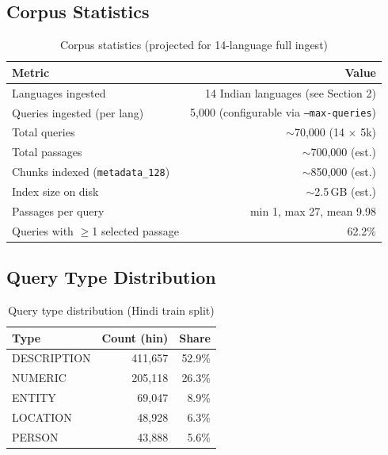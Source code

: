 \documentclass[12pt,a4paper]{article}
\begin{document}
\subsection{Corpus Statistics}

\begin{table}[H]
\centering
\begin{tabular}{lr}
\toprule
\textbf{Metric} & \textbf{Value} \\
\midrule
Languages ingested                    & 14 Indian languages (see Section 2) \\
Queries ingested (per lang)           & 5,000 (configurable via \texttt{--max-queries}) \\
Total queries                         & $\sim$70,000 (14 $\times$ 5k) \\
Total passages                        & $\sim$700,000 (est.) \\
Chunks indexed (\texttt{metadata\_128}) & $\sim$850,000 (est.) \\
Index size on disk                    & $\sim$2.5\,GB (est.) \\
Passages per query                    & min 1, max 27, mean 9.98 \\
Queries with $\geq$1 selected passage & 62.2\% \\
\bottomrule
\end{tabular}
\caption{Corpus statistics (projected for 14-language full ingest)}
\end{table}

\subsection{Query Type Distribution}

\begin{table}[H]
\centering
\begin{tabular}{lrr}
\toprule
\textbf{Type} & \textbf{Count (hin)} & \textbf{Share} \\
\midrule
DESCRIPTION & 411,657 & 52.9\% \\
NUMERIC     & 205,118 & 26.3\% \\
ENTITY      &  69,047 &  8.9\% \\
LOCATION    &  48,928 &  6.3\% \\
PERSON      &  43,888 &  5.6\% \\
\bottomrule
\end{tabular}
\caption{Query type distribution (Hindi train split)}
\end{table}
\end{document}
